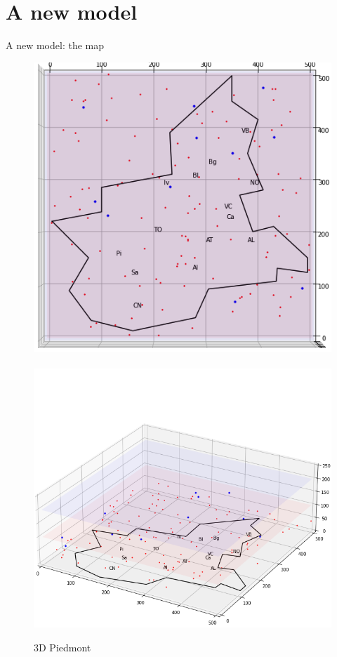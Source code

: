 \documentclass[8pt]{beamer}
\begin{document}
\section{A new model}

\begin{frame}{A new model: the map}

\begin{figure}[H]
\center
\includegraphics[scale=0.25]{Piem1.png}~~~~~~~~~\includegraphics[scale=0.25]{Piem2.png} 

\caption{3D Piedmont} 
\label{Piem}
\end{figure}

\end{frame}
\end{document}
